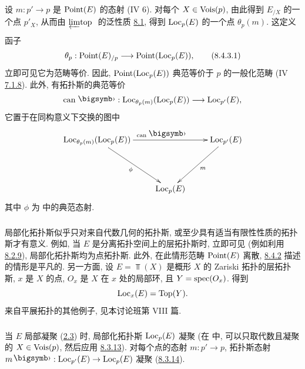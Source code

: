 \subsubsection{}

设 $m:p'\to p$ 是 $\operatorname{Point}(E)$ 的态射 (IV 6).
对每个 $X\in\operatorname{Vois}(p)$,
由此得到 $E_{/X}$ 的一个点 $p'_X$,
从而由 ${\displaystyle{\varprojlim_{}\!\mbox{\rm top }}}$ 的泛性质 \hyperref[VI.subsec8.1]{8.1},
得到 $\operatorname{Loc}_p(E)$ 的一个点 $\theta_p(m)$.
这定义函子
\begin{equation*}
\theta_p:\Point(E)_{/p}\to\Point(\Loc_p(E)){\quoi},\tag{8.4.3.1}
\end{equation*}
立即可见它为范畴等价.
因此, $\operatorname{Point}(\operatorname{Loc}_p(E))$
典范等价于 $p$ 的一般化范畴
(IV \hyperref[IV.subsubsec7.1.8]{7.1.8}).
此外, 有拓扑斯的典范等价
$$
\can\bigdot:\Loc_{\theta_p(m)}(\Loc_p(E))\to\Loc_{p'}(E){\quoi},
$$
它置于在同构意义下交换的图中
\[
\xymatrix@R=1.5cm{
\Loc_{\theta_p(m)}(\Loc_p(E))\ar[rr]^{\can\bigdot}\ar[rd]_{\phi}
&&\Loc_{p'}(E)\ar[ld]^{m}\\
&\Loc_p(E)&
}
\]
其中 $\phi$\pageoriginale{}
为  中的典范态射.

\subsubsection{}

局部化拓扑斯似乎只对来自代数几何的拓扑斯,
或至少具有适当有限性性质的拓扑斯才有意义.
例如, 当 $E$ 是分离拓扑空间上的层拓扑斯时,
立即可见 (例如利用 \hyperref[VI.thm8.2.9]{8.2.9}),
局部化拓扑斯均为点拓扑斯.
此外, 在此情形范畴 $\operatorname{Point}(E)$ 离散,
\hyperref[VI.subsubsec8.4.2]{8.4.2} 描述的情形是平凡的.
另一方面, 设 $E=\Top(X)$ 是概形 $X$ 的 Zariski 拓扑的层拓扑斯,
$x$ 是 $X$ 的点,
$O_x$ 是 $X$ 在 $x$ 处的局部环,
且 $Y=\operatorname{spec}(O_x)$.
得到
$$
\operatorname{Loc}_x(E)=\operatorname{Top}(Y){}.
$$
来自平展拓扑的其他例子, 见本讨论班第 VIII 篇.

\subsubsection{}

当 $E$ 局部凝聚 (\hyperref[VI.def2.3]{2.3}) 时,
局部化拓扑斯 $\operatorname{Loc}_p(E)$ 凝聚
(在  中,
可以只取代数且凝聚的 $X\in\operatorname{Vois}(p)$,
然后应用 \hyperref[VI.thm8.3.13]{8.3.13}).
对每个点的态射 $m:p'\to p$,
拓扑斯态射 $m\bigdot:\Loc_{p'}(E)\to\Loc_p(E)$ 凝聚
(\hyperref[VI.cor8.3.14]{8.3.14}).

